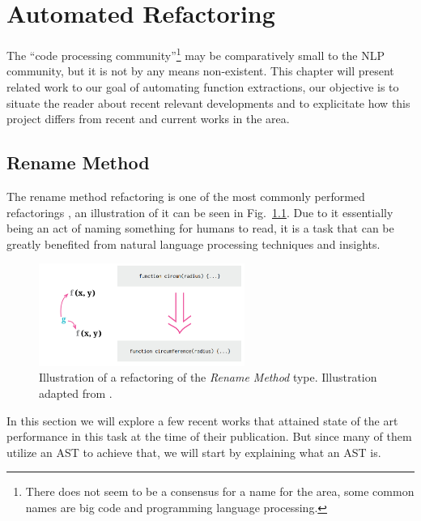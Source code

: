 
\chapter{Automated Refactoring}
\label{chap:related_work}




The ``code processing community''\footnote{There does not seem to be a consensus for a name for the area, some common names are big code and programming language processing.} may be comparatively small to the NLP community, but it is not by any means non-existent. This chapter will present related work to our goal of automating function extractions, our objective is to situate the reader about recent relevant developments and to explicitate how this project differs from recent and current works in the area.



\section{Rename Method}
The rename method refactoring is one of the most commonly performed refactorings \citep{mauricio_paper}, an illustration of it can be seen in Fig.~\ref{fig:rename_method}. Due to it essentially being an act of naming something for humans to read, it is a task that can be greatly benefited from natural language processing techniques and insights. 


\begin{figure}[!ht]
\centerline{\includegraphics[width=0.6\textwidth]{figuras/rename_method.png}}
\caption{Illustration of a refactoring of the \textit{Rename Method} type. Illustration adapted from \citet{rename_method}.}
\label{fig:rename_method}
\end{figure}


In this section we will explore a few recent works that attained state of the art performance in this task at the time of their publication. But since many of them utilize an AST to achieve that, we will start by explaining what an AST is.



